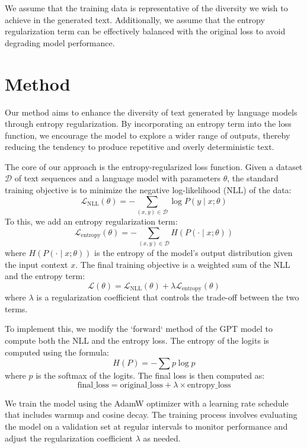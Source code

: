 \documentclass{article} %
\begin{document}
We assume that the training data is representative of the diversity we wish to achieve in the generated text. Additionally, we assume that the entropy regularization term can be effectively balanced with the original loss to avoid degrading model performance.

\section{Method}
\label{sec:method}

Our method aims to enhance the diversity of text generated by language models through entropy regularization. By incorporating an entropy term into the loss function, we encourage the model to explore a wider range of outputs, thereby reducing the tendency to produce repetitive and overly deterministic text.

The core of our approach is the entropy-regularized loss function. Given a dataset \( \mathcal{D} \) of text sequences and a language model with parameters \( \theta \), the standard training objective is to minimize the negative log-likelihood (NLL) of the data:
\[
\mathcal{L}_{\text{NLL}}(\theta) = -\sum_{(x, y) \in \mathcal{D}} \log P(y \mid x; \theta)
\]
To this, we add an entropy regularization term:
\[
\mathcal{L}_{\text{entropy}}(\theta) = -\sum_{(x, y) \in \mathcal{D}} H(P(\cdot \mid x; \theta))
\]
where \( H(P(\cdot \mid x; \theta)) \) is the entropy of the model's output distribution given the input context \( x \). The final training objective is a weighted sum of the NLL and the entropy term:
\[
\mathcal{L}(\theta) = \mathcal{L}_{\text{NLL}}(\theta) + \lambda \mathcal{L}_{\text{entropy}}(\theta)
\]
where \( \lambda \) is a regularization coefficient that controls the trade-off between the two terms.

To implement this, we modify the `forward` method of the GPT model to compute both the NLL and the entropy loss. The entropy of the logits is computed using the formula:
\[
H(P) = -\sum p \log p
\]
where \( p \) is the softmax of the logits. The final loss is then computed as:
\[
\text{final\_loss} = \text{original\_loss} + \lambda \times \text{entropy\_loss}
\]

We train the model using the AdamW optimizer \citep{loshchilov2017adamw} with a learning rate schedule that includes warmup and cosine decay. The training process involves evaluating the model on a validation set at regular intervals to monitor performance and adjust the regularization coefficient \( \lambda \) as needed.
\end{document}
